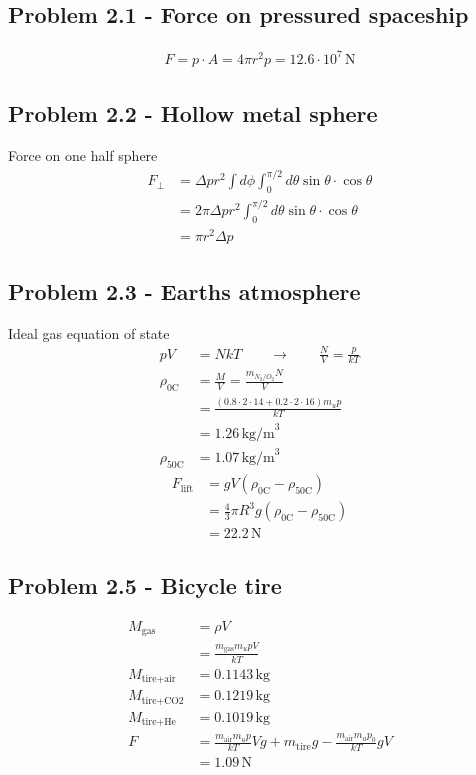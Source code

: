 \documentclass[../main.tex]{subfiles}
\begin{document}
\subsection{Problem 2.1 - Force on pressured spaceship }
\begin{align}
F=p\cdot A=4\pi r^2 p=12.6\cdot 10^7\,\text{N}
\end{align}

\subsection{Problem 2.2 - Hollow metal sphere}
Force on one half sphere
\begin{align}
F_\perp
&=\Delta pr^2\int d\phi\int_0^{\pi/2} d\theta\sin\theta\cdot\cos\theta\\
&=2\pi \Delta pr^2\int_0^{\pi/2} d\theta\sin\theta\cdot\cos\theta\\
&=\pi r^2 \Delta p
\end{align}

\subsection{Problem 2.3 - Earths atmosphere}
Ideal gas equation of state
\begin{align}
pV&=NkT\qquad\rightarrow\qquad\frac{N}{V}=\frac{p}{kT}\\
\rho_\text{0C}&=\frac{M}{V}=\frac{m_{N_2/O_2}N}{V}\\
&=\frac{(0.8\cdot2\cdot14+0.2\cdot2\cdot16)m_u p}{kT}\\
&=1.26\,\text{kg/m}^3\\
\rho_\text{50C}&=1.07\,\text{kg/m}^3
\end{align}
\begin{align}
F_\text{lift}&=gV(\rho_\text{0C}-\rho_\text{50C})\\
&=\frac{4}{3}\pi R^3g(\rho_\text{0C}-\rho_\text{50C})\\
&=22.2\,\text{N}
\end{align}

\subsection{Problem 2.5 - Bicycle tire}
\begin{align}
M_\text{gas}
&=\rho V\\
&=\frac{m_\text{gas}m_u pV}{kT}\\
M_\text{tire+air}&=0.1143\,\text{kg}\\
M_\text{tire+CO2}&=0.1219\,\text{kg}\\
M_\text{tire+He}&=0.1019\,\text{kg}\\
F&=\frac{m_\text{air}m_u p}{kT}Vg+m_\text{tire}g-\frac{m_\text{air}m_u p_0}{kT}gV\\
&=1.09\,\text{N}
\end{align}
\end{document}
